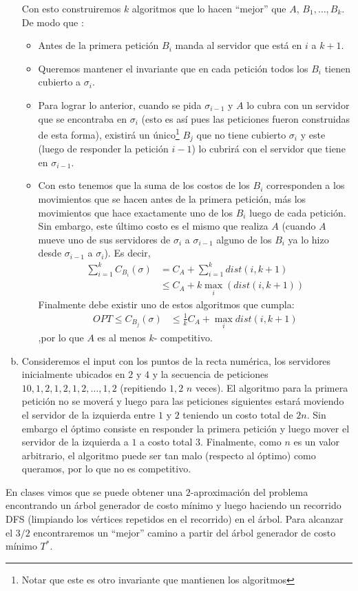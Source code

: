 \documentclass[dcc,uchile]{fcfmcourse}
\begin{document}
\begin{problems}
\begin{enumerate}[a)]
Con esto construiremos $k$ algoritmos que lo hacen ``mejor'' que $A$, $B_{1}, \ldots, B_{k}$. De modo que :
\begin{itemize}
    \item Antes de la primera petición $B_{i}$ manda al servidor que está en $i$ a $k+1$.
    \item Queremos mantener el invariante que en cada petición todos los $B_{i}$ tienen cubierto a $\sigma_{i}$.
    \item Para lograr lo anterior, cuando se pida $\sigma_{i-1}$ y $A$ lo cubra con un servidor que se encontraba en $\sigma_{i}$ (esto es así pues las peticiones fueron construidas de esta forma), existirá un único\footnote{Notar que este es otro invariante que mantienen los algoritmos} $B_{j}$ que no tiene cubierto $\sigma_{i}$ y este (luego de responder la petición $i-1$) lo cubrirá con el servidor que tiene en $\sigma_{i-1}$.
    \item Con esto tenemos que la suma de los costos de los $B_{i}$ corresponden a los movimientos que se hacen antes de la primera petición, más los movimientos que hace exactamente uno de los $B_{i}$ luego de cada petición. Sin embargo, este último costo es el mismo que realiza $A$ (cuando $A$ mueve uno de sus servidores de $\sigma_{i}$ a $\sigma_{i-1}$ alguno de los $B_{i}$ ya lo hizo desde $\sigma_{i-1}$ a $\sigma_{i}$). Es decir,
    \begin{align*}
        \sum_{i=1}^k C_{B_{i}}(\sigma) &= C_{A} + \sum_{i=1}^k dist(i, k+1)\\
        &\le C_{A} + k\max_i (dist(i, k+1))
    \end{align*}
    Finalmente debe existir uno de estos algoritmos que cumpla:
    \begin{align*}
        OPT \le C_{B_{j}}(\sigma) &\le \frac{1}{k}C_{A} + \max_i dist(i, k+1)
    \end{align*}
    ,por lo que $A$ es al menos $k$- competitivo.
\end{itemize}
\item Consideremos el input con los puntos de la recta numérica, los servidores inicialmente ubicados en $2$ y $4$ y la secuencia de peticiones $10, 1, 2, 1, 2, 1, 2, \ldots, 1, 2$ (repitiendo $1, 2$ $n$ veces). El algoritmo para la primera petición no se moverá y luego para las peticiones siguientes estará moviendo el servidor de la izquierda entre $1$ y $2$ teniendo un costo total de $2n$. Sin embargo el óptimo consiste en responder la primera petición y luego mover el servidor de la izquierda a $1$ a costo total $3$. Finalmente, como $n$ es un valor arbitrario, el algoritmo puede ser tan malo (respecto al óptimo) como queramos, por lo que no es competitivo.
\end{enumerate}
\problem En clases vimos que se puede obtener una $2$-aproximación del problema encontrando un árbol generador de costo mínimo y luego haciendo un recorrido DFS (limpiando los vértices repetidos en el recorrido) en el árbol. Para alcanzar el $3/2$ encontraremos un ``mejor'' camino a partir del árbol generador de costo mínimo $T^*$.\\


\end{problems}
\end{document}
